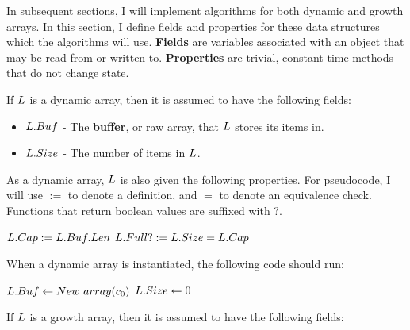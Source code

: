 In subsequent sections, I will implement algorithms for both dynamic and growth arrays. In this section, I define fields and properties for these data structures which the algorithms will use. \textbf{Fields} are variables associated with an object that may be read from or written to. \textbf{Properties} are trivial, constant-time methods that do not change state.

If $\VarList$ is a dynamic array, then it is assumed to have the following fields:

\begin{itemize}
	\item $L.Buf$ - The \textbf{buffer}, or raw array, that $\VarList$ stores its items in.
	\item $L.Size$ - The number of items in $\VarList$.
\end{itemize}

As a dynamic array, $\VarList$ is also given the following properties. {\HdrNote} For pseudocode, I will use $:=$ to denote a definition, and $=$ to denote an equivalence check. Functions that return boolean values are suffixed with ?.

\begin{algorithm}
	\begin{algorithmic}
		\State $L.Cap := L.Buf.Len$
		\State
		\State $L.Full? := L.Size = L.Cap$
	\end{algorithmic}
\end{algorithm}

When a dynamic array is instantiated, the following code should run:

\begin{algorithm}
	\begin{algorithmic}
		\Procedure{$\FuncConstructor$}{$\VarList$}
			\State $L.Buf \gets New\ array(c_0)$
			\State $L.Size \gets 0$
		\EndProcedure
	\end{algorithmic}
\end{algorithm}

If $\VarList$ is a growth array, then it is assumed to have the following fields:

